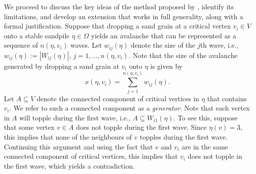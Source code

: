 \documentclass{article}
\begin{document}
We proceed to discuss the key ideas of the method proposed by \citet{Dorso}, identify its limitations, and develop an extension that works in full generality, along with a formal justification. Suppose that dropping a sand grain at a critical vertex $v_i \in V$ onto a stable sandpile $\eta \in \Omega$ yields an avalanche that can be represented as a sequence of $n(\eta, v_i)$ waves. Let $w_{ij}(\eta)$ denote the size of the $j$th wave, i.e., $w_{ij}(\eta) := |W_{ij}(\eta)|$, $j = 1, \ldots, n(\eta, v_i)$. Note that the size of the avalanche generated by dropping a sand grain at $v_i$ onto $\eta$ is given by 
\begin{equation}\label{sum_of_waves}
    x(\eta, v_i) = \sum\limits_{j = 1}^{n(\eta, v_i)} w_{ij}(\eta).
\end{equation}
Let $A \subseteq V$ denote the connected component of critical vertices in $\eta$ that contains $v_i$. We refer to such a connected component as a \textit{generator}. Note that each vertex in $A$ will topple during the first wave, i.e., $A \subseteq W_{i1}(\eta)$. To see this, suppose that some vertex $v \in A$ does not topple during the first wave. Since $\eta(v) = 3$, this implies that none of the neighbours of $v$ topples during the first wave. Continuing this argument and using the fact that $v$ and $v_i$ are in the same connected component of critical vertices, this implies that $v_i$ does not topple in the first wave, which yields a contradiction.
\end{document}
